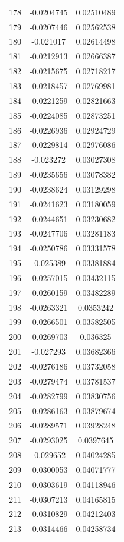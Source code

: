 \documentclass[a4paper, 11pt, oneside]{report}
\begin{document}
{\begin{longtable}{|c|c|c|}
178 & -0.0204745 & 0.02510489 \\
179 & -0.0207446 & 0.02562538 \\
180 & -0.021017  & 0.02614498 \\
181 & -0.0212913 & 0.02666387 \\
182 & -0.0215675 & 0.02718217 \\
183 & -0.0218457 & 0.02769981 \\
184 & -0.0221259 & 0.02821663 \\
185 & -0.0224085 & 0.02873251 \\
186 & -0.0226936 & 0.02924729 \\
187 & -0.0229814 & 0.02976086 \\
188 & -0.023272  & 0.03027308 \\
189 & -0.0235656 & 0.03078382 \\
190 & -0.0238624 & 0.03129298 \\
191 & -0.0241623 & 0.03180059 \\
192 & -0.0244651 & 0.03230682 \\
193 & -0.0247706 & 0.03281183 \\
194 & -0.0250786 & 0.03331578 \\
195 & -0.025389  & 0.03381884 \\
196 & -0.0257015 & 0.03432115 \\
197 & -0.0260159 & 0.03482289 \\
198 & -0.0263321 & 0.0353242  \\
199 & -0.0266501 & 0.03582505 \\
200 & -0.0269703 & 0.036325   \\
201 & -0.027293  & 0.03682366 \\
202 & -0.0276186 & 0.03732058 \\
203 & -0.0279474 & 0.03781537 \\
204 & -0.0282799 & 0.03830756 \\
205 & -0.0286163 & 0.03879674 \\
206 & -0.0289571 & 0.03928248 \\
207 & -0.0293025 & 0.0397645  \\
208 & -0.029652  & 0.04024285 \\
209 & -0.0300053 & 0.04071777 \\
210 & -0.0303619 & 0.04118946 \\
211 & -0.0307213 & 0.04165815 \\
212 & -0.0310829 & 0.04212403 \\
213 & -0.0314466 & 0.04258734 \\

\end{longtable}}
\end{document}
